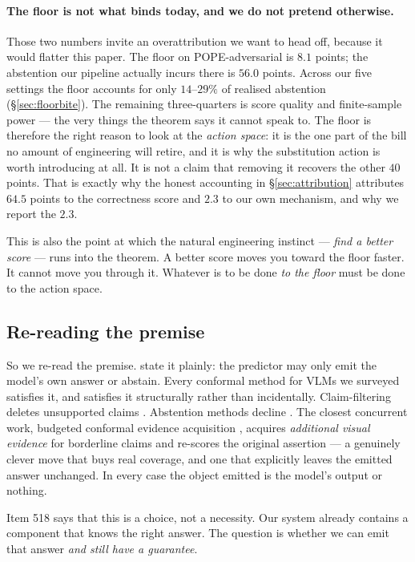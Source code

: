\documentclass{article}
\theoremstyle{plain}
\theoremstyle{definition}
\theoremstyle{remark}
\begin{document}
\paragraph{The floor is not what binds today, and we do not pretend otherwise.}
Those two numbers invite an overattribution we want to head off, because it would flatter
this paper. The floor on POPE-adversarial is $8.1$ points; the abstention our pipeline
actually incurs there is $56.0$ points. Across our five settings the floor accounts for only
$14$--$29\%$ of realised abstention (\S\ref{sec:floorbite}). The remaining three-quarters is
score quality and finite-sample power --- the very things the theorem says it cannot speak
to. The floor is therefore the right reason to look at the \emph{action space}: it is the one
part of the bill no amount of engineering will retire, and it is why the substitution action
is worth introducing at all. It is not a claim that removing it recovers the other
$40$ points. That is exactly why the honest accounting in \S\ref{sec:attribution} attributes
$64.5$ points to the correctness score and $2.3$ to our own mechanism, and why we report the
$2.3$.

This is also the point at which the natural engineering instinct --- \emph{find a better
score} --- runs into the theorem. A better score moves you toward the floor faster. It cannot
move you through it. Whatever is to be done \emph{to the floor} must be done to the action
space.

\subsection{Re-reading the premise}

So we re-read the premise. \citet{crcimposs} state it plainly: the predictor may only emit
the model's own answer or abstain. Every conformal method for VLMs we surveyed satisfies
it, and satisfies it structurally rather than incidentally. Claim-filtering deletes
unsupported claims \citep{conflvlm,conformalfactuality}. Abstention methods decline
\citep{onlineabstention,twoaxes}. The closest concurrent work, budgeted conformal evidence
acquisition \citep{bcea}, acquires \emph{additional visual evidence} for borderline claims
and re-scores the original assertion --- a genuinely clever move that buys real coverage,
and one that explicitly leaves the emitted answer unchanged. In every case the object
emitted is the model's output or nothing.

Item 518 says that this is a choice, not a necessity. Our system already contains a
component that knows the right answer. The question is whether we can emit that answer
\emph{and still have a guarantee}.
\end{document}
